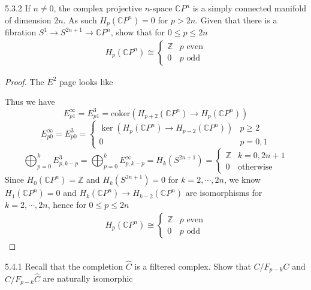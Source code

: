 \documentclass[../main.tex]{subfiles}
\begin{document}
\begin{customexercise}{5.3.2}
If $n\neq0$, the complex projective $n$-space $\mathbb CP^n$ is a simply connected manifold of dimension $2n$. As such $H_p(\mathbb CP^n)=0$ for $p>2n$. Given that there is a fibration $S^1\to S^{2n+1}\to\mathbb CP^n$, show that for $0\leq p\leq 2n$
\begin{align*}
H_p(\mathbb CP^n)\cong\begin{cases}
\mathbb Z &p\text{ even} \\
0 &p\text{ odd}
\end{cases}
\end{align*}
\end{customexercise}

\begin{proof}
The $E^2$ page looks like
\begin{center}
\end{center}
Thus we have
\[E^\infty_{p1}=E^3_{p1}=\mathrm{coker}(H_{p+2}(\mathbb CP^n)\to H_{p}(\mathbb CP^n))\]
\[E^\infty_{p0}=E^3_{p0}=\begin{cases}
\ker(H_p(\mathbb CP^n)\to H_{p-2}(\mathbb CP^n)) &p\geq2 \\
0 &p=0,1
\end{cases}\]
\[\bigoplus_{p=0}^{k}E^3_{p,k-p}=\bigoplus_{p=0}^{k}E^\infty_{p,k-p}=H_k(S^{2n+1})=\begin{cases}
\mathbb Z &k=0,2n+1 \\
0 &\text{otherwise}
\end{cases}\]
Since $H_0(\mathbb CP^n)=\mathbb Z$ and $H_k(S^{2n+1})=0$ for $k=2,\cdots,2n$, we know $H_1(\mathbb CP^n)=0$ and $H_{k}(\mathbb CP^n)\to H_{k-2}(\mathbb CP^n)$ are isomorphisms for $k=2,\cdots,2n$, hence for $0\leq p\leq2n$
\begin{align*}
H_p(\mathbb CP^n)\cong\begin{cases}
\mathbb Z &p\text{ even} \\
0 &p\text{ odd}
\end{cases}
\end{align*}
\end{proof}

\begin{customexercise}{5.4.1}
Recall that the completion $\widehat C$ is a filtered complex. Show that $C/F_{p-k}C$ and $\widehat C/F_{p-k}\widehat C$ are naturally isomorphic
\end{customexercise}
\end{document}
